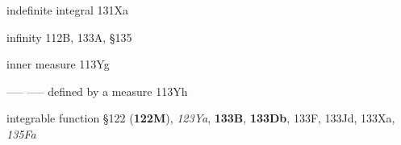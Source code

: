 

indefinite integral 131Xa





























































infinity 112B, 133A, \S135
















inner measure 113Yg

----- ----- defined by a measure 113Yh 





















integrable function \S122 ({\bf 122M}), {\it 123Ya}, {\bf 133B}, {\bf
133Db}, 133F, 133Jd, 133Xa, {\it 135Fa}

